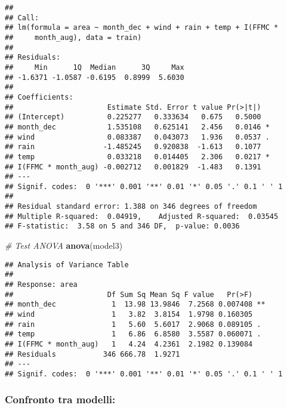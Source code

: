 \documentclass[
]{article}
\newenvironment{Shaded}{\begin{snugshade}}{\end{snugshade}}
\newcommand{\CommentTok}[1]{\textcolor[rgb]{0.56,0.35,0.01}{\textit{#1}}}
\newcommand{\FunctionTok}[1]{\textcolor[rgb]{0.13,0.29,0.53}{\textbf{#1}}}
\newcommand{\NormalTok}[1]{#1}
\begin{document}
\begin{verbatim}
## 
## Call:
## lm(formula = area ~ month_dec + wind + rain + temp + I(FFMC * 
##     month_aug), data = train)
## 
## Residuals:
##     Min      1Q  Median      3Q     Max 
## -1.6371 -1.0587 -0.6195  0.8999  5.6030 
## 
## Coefficients:
##                      Estimate Std. Error t value Pr(>|t|)  
## (Intercept)          0.225277   0.333634   0.675   0.5000  
## month_dec            1.535108   0.625141   2.456   0.0146 *
## wind                 0.083387   0.043073   1.936   0.0537 .
## rain                -1.485245   0.920838  -1.613   0.1077  
## temp                 0.033218   0.014405   2.306   0.0217 *
## I(FFMC * month_aug) -0.002712   0.001829  -1.483   0.1391  
## ---
## Signif. codes:  0 '***' 0.001 '**' 0.01 '*' 0.05 '.' 0.1 ' ' 1
## 
## Residual standard error: 1.388 on 346 degrees of freedom
## Multiple R-squared:  0.04919,    Adjusted R-squared:  0.03545 
## F-statistic:  3.58 on 5 and 346 DF,  p-value: 0.0036
\end{verbatim}

\begin{Shaded}
\begin{Highlighting}[]
\CommentTok{\# Test ANOVA}
\FunctionTok{anova}\NormalTok{(model3)}
\end{Highlighting}
\end{Shaded}

\begin{verbatim}
## Analysis of Variance Table
## 
## Response: area
##                      Df Sum Sq Mean Sq F value   Pr(>F)   
## month_dec             1  13.98 13.9846  7.2568 0.007408 **
## wind                  1   3.82  3.8154  1.9798 0.160305   
## rain                  1   5.60  5.6017  2.9068 0.089105 . 
## temp                  1   6.86  6.8580  3.5587 0.060071 . 
## I(FFMC * month_aug)   1   4.24  4.2361  2.1982 0.139084   
## Residuals           346 666.78  1.9271                    
## ---
## Signif. codes:  0 '***' 0.001 '**' 0.01 '*' 0.05 '.' 0.1 ' ' 1
\end{verbatim}

\hypertarget{confronto-tra-modelli}{%
\subsubsection{Confronto tra modelli:}\label{confronto-tra-modelli}}
\end{document}
